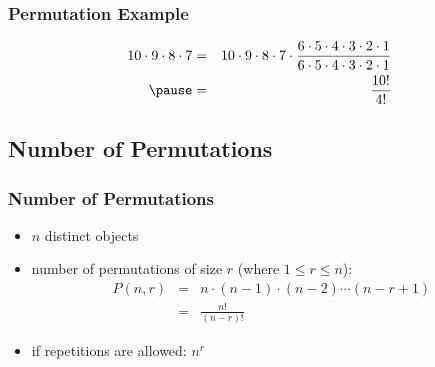 \documentclass[dvipsnames]{beamer}
\begin{document}
\begin{frame}
  \frametitle{Permutation Example}

  \begin{eqnarray*}
    10 \cdot 9 \cdot 8 \cdot 7 & = &
      10 \cdot 9 \cdot 8 \cdot 7 \cdot
      \frac{6 \cdot 5 \cdot 4 \cdot 3 \cdot 2 \cdot 1}
      {6 \cdot 5 \cdot 4 \cdot 3 \cdot 2 \cdot 1}\\\pause
    & = & \frac{10!}{4!}
  \end{eqnarray*}
\end{frame}

\subsection{Number of Permutations}

\begin{frame}
  \frametitle{Number of Permutations}

  \begin{itemize}
    \item $n$ distinct objects
    \item number of permutations of size $r$ (where $1 \leq r \leq n$):\\
    \begin{eqnarray*}
      P(n,r) & = & n \cdot (n-1) \cdot (n-2) \cdots (n-r+1)\\
              & = & \frac{n!}{(n-r)!}
    \end{eqnarray*}

    \pause
    \medskip
    \item if repetitions are allowed: $n^r$
  \end{itemize}
\end{frame}
\end{document}
